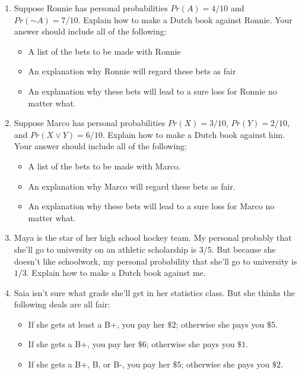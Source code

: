\documentclass[justified]{tufte-book}
\providecommand{\tightlist}{%
  \setlength{\itemsep}{0pt}\setlength{\parskip}{0pt}}
\renewcommand{\neg}{\mathbin{\sim}}
\newcommand{\p}{Pr}
\theoremstyle{definition}
\theoremstyle{definition}
\theoremstyle{definition}
\theoremstyle{remark}
\begin{document}
\begin{enumerate}
\item
  Suppose Ronnie has personal probabilities \(\p(A) = 4/10\) and \(\p(\neg A) = 7/10\). Explain how to make a Dutch book against Ronnie. Your answer should include all of the following:

  \begin{itemize}
  \tightlist
  \item
    A list of the bets to be made with Ronnie
  \item
    An explanation why Ronnie will regard these bets as fair
  \item
    An explanation why these bets will lead to a sure loss for Ronnie no matter what.
  \end{itemize}
\item
  Suppose Marco has personal probabilities \(\p(X) = 3/10\), \(\p(Y) = 2/10\), and \(\p(X \vee Y) = 6/10\). Explain how to make a Dutch book against him. Your answer should include all of the following:

  \begin{itemize}
  \tightlist
  \item
    A list of the bets to be made with Marco.
  \item
    An explanation why Marco will regard these bets as fair.
  \item
    An explanation why these bets will lead to a sure loss for Marco no matter what.
  \end{itemize}
\item
  Maya is the star of her high school hockey team. My personal probably that she'll go to university on an athletic scholarship is \(3/5\). But because she doesn't like schoolwork, my personal probability that she'll go to university is \(1/3\). Explain how to make a Dutch book against me.
\item
  Saia isn't sure what grade she'll get in her statistics class. But she thinks the following deals are all fair:

  \begin{itemize}
  \tightlist
  \item
    If she gets at least a B+, you pay her \(\$2\); otherwise she pays you \(\$5\).
  \item
    If she gets a B+, you pay her \(\$6\); otherwise she pays you \(\$1\).
  \item
    If she gets a B+, B, or B-, you pay her \(\$5\); otherwise she pays you \(\$2\).
  \end{itemize}


\end{enumerate}
\end{document}
